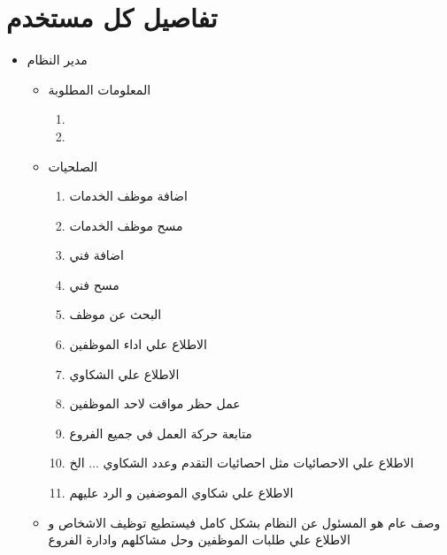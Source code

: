 \documentclass[25pt]{article}
\begin{document}
	\section{تفاصيل كل مستخدم}
	\begin{itemize}
		\item مدير النظام
		\begin{itemize}
			\item المعلومات المطلوبة
			\begin{enumerate}
				\item{}
				\item{}
			\end{enumerate}
			\item الصلحيات
			\begin{enumerate}
				\item اضافة موظف الخدمات
				\item مسح موظف الخدمات 
				\item اضافة فني
				\item مسح فني 
				\item البحث عن موظف
				\item الاطلاع علي اداء الموظفين 
				\item الاطلاع علي الشكاوي 
				\item عمل حظر مواقت لاحد الموظفين
				\item متابعة حركة العمل في جميع الفروع
				\item  الاطلاع علي الاحصائيات مثل احصائيات التقدم وعدد الشكاوي ... الخ 
				\item الاطلاع علي شكاوي الموضفين و الرد عليهم
				\newline
			\end{enumerate}
			\item وصف عام 
			\newline
			هو المسئول عن النظام بشكل كامل فيستطيع توظيف الاشخاص و الاطلاع علي طلبات الموظفين وحل مشاكلهم وادارة الفروع 
		\newline
		\newline
		\end{itemize}
		

\end{itemize}
\end{document}
